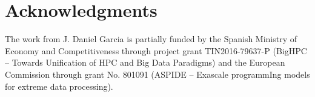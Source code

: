 \section*{Acknowledgments}

The work from J. Daniel Garcia is partially funded by
the Spanish Ministry of Economy and Competitiveness through project grant
TIN2016-79637-P (BigHPC -- Towards Unification of HPC and Big Data Paradigms)
and the European Commission through grant
No. 801091 (ASPIDE -- Exascale programmIng models for extreme data processing).


